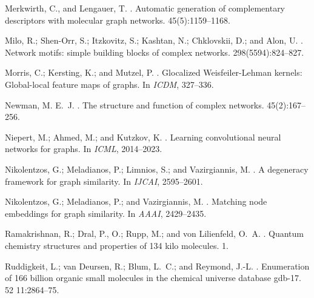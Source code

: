 \documentclass[letterpaper]{article}
\theoremstyle{definition}
\begin{document}
\begin{thebibliography}{}
	Merkwirth, C., and Lengauer, T.
	.
	\newblock Automatic generation of complementary descriptors with molecular
	graph networks.
	 45(5):1159--1168.
	
	Milo, R.; Shen-Orr, S.; Itzkovitz, S.; Kashtan, N.; Chklovskii, D.; and Alon,
	U.
	.
	\newblock Network motifs: simple building blocks of complex networks.
	 298(5594):824--827.
	
	Morris, C.; Kersting, K.; and Mutzel, P.
	.
	\newblock Glocalized {W}eisfeiler-{L}ehman kernels: Global-local feature maps
	of graphs.
	\newblock In {\em ICDM},  327--336.
	
	Newman, M. E.~J.
	.
	\newblock The structure and function of complex networks.
	 45(2):167--256.
	
	Niepert, M.; Ahmed, M.; and Kutzkov, K.
	.
	\newblock Learning convolutional neural networks for graphs.
	\newblock In {\em ICML},  2014--2023.
	
	Nikolentzos, G.; Meladianos, P.; Limnios, S.; and Vazirgiannis, M.
	.
	\newblock A degeneracy framework for graph similarity.
	\newblock In {\em IJCAI},  2595--2601.
	
	Nikolentzos, G.; Meladianos, P.; and Vazirgiannis, M.
	.
	\newblock Matching node embeddings for graph similarity.
	\newblock In {\em AAAI},  2429--2435.
	
	Ramakrishnan, R.; Dral, P., O.; Rupp, M.; and von Lilienfeld, O.~A.
	.
	\newblock Quantum chemistry structures and properties of 134 kilo molecules.
	 1.
	
	Ruddigkeit, L.; van Deursen, R.; Blum, L.~C.; and Reymond, J.-L.
	.
	\newblock Enumeration of 166 billion organic small molecules in the chemical
	universe database gdb-17.
	 52 11:2864--75.
	

\end{thebibliography}
\end{document}
